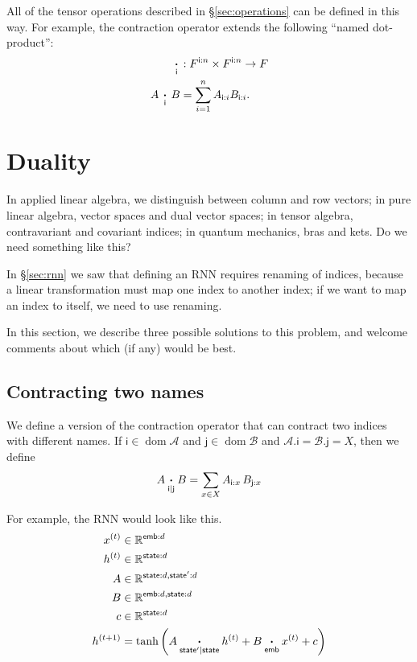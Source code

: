 \documentclass{article}
\newcommand{\name}[1]{\mathsf{#1}}
\newcommand{\ndot}[1]{\mathbin{\mathop{\thinspace\boldsymbol\cdot\thinspace}\limits_{\name{#1}}}}
\newcommand{\nndot}[2]{\mathbin{\mathop{\thinspace\boldsymbol\cdot\thinspace}\limits_{\name{#1}|\name{#2}}}}
\DeclareMathOperator{\tupledom}{dom}
\newcommand{\tupleproj}[2]{#1.#2}
\begin{document}
All of the tensor operations described in \S\ref{sec:operations} can be defined in this way. For example, the contraction operator extends the following ``named dot-product'':
\begin{align*}
\ndot{i} &: F^{\name{i}:n} \times F^{\name{i}:n} \rightarrow F \\
A \ndot{i} B &= \sum_{i=1}^n A_{\name{i}:i} B_{\name{i}:i}.
\end{align*}

\section{Duality}
\label{sec:duality}

In applied linear algebra, we distinguish between column and row vectors; in pure linear algebra, vector spaces and dual vector spaces; in tensor algebra, contravariant and covariant indices; in quantum mechanics, bras and kets. Do we need something like this?

In \S\ref{sec:rnn} we saw that defining an RNN requires renaming of indices, because a linear transformation must map one index to another index; if we want to map an index to itself, we need to use renaming.

In this section, we describe three possible solutions to this problem, and welcome comments about which (if any) would be best.

\subsection{Contracting two names}

We define a version of the contraction operator that can contract two indices with different names. If $\name{i} \in \tupledom \mathcal{A}$ and $\name{j} \in \tupledom \mathcal{B}$ and $\tupleproj{\mathcal{A}}{\name{i}} = \tupleproj{\mathcal{B}}{\name{j}} = X$, then we define
\begin{equation*}
A \nndot{i}{j} B = \sum_{x \in X} A_{\name{i}: x} \, B_{\name{j}: x}
\end{equation*}

For example, the RNN would look like this.
\begin{align*}
x^{(t)} &\in \mathbb{R}^{\name{emb}: d} \\
h^{(t)} &\in \mathbb{R}^{\name{state}: d} \\
A &\in \mathbb{R}^{\name{state}: d, \name{state'}: d} \\
B &\in \mathbb{R}^{\name{emb}: d, \name{state}: d} \\
c &\in \mathbb{R}^{\name{state}: d} \\
h^{(t+1)} &= \tanh\left( A \nndot{state'}{state} h^{(t)} + B \ndot{emb} x^{(t)} + c \right)
\end{align*}
\end{document}
